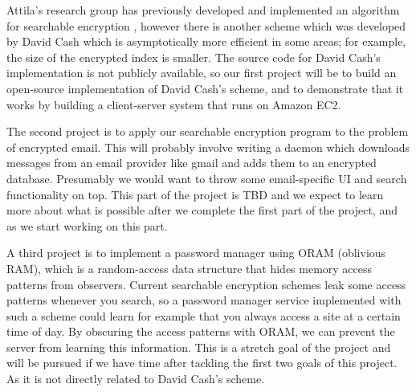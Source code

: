 

Attila's research group has previously developed and implemented an algorithm for searchable encryption \cite{yavuz15},
however there is another scheme which was developed by David Cash which is asymptotically more efficient \cite{cash14}
in some areas; for example, the size of the encrypted index is smaller.
The source code for David Cash's implementation is not publicly available, so
our first project will be to build an open-source implementation of David Cash's scheme,
and to demonstrate that it works by building a client-server system that runs on Amazon EC2.





The second project is to apply our searchable encryption program to the problem of encrypted email.
This will probably involve writing a daemon which downloads messages from an email provider like gmail
and adds them to an encrypted database.
Presumably we would want to throw some email-specific UI and search functionality on top.
This part of the project is TBD and we expect to learn more about what is possible after we complete the first part of the project, and as we start working on this part.




A third project is to implement a password manager using ORAM (oblivious RAM),
which is a random-access data structure that hides memory access patterns from observers.
Current searchable encryption schemes leak some access patterns whenever you search,
so a password manager service implemented with such a scheme could learn for example that you always access a site at a certain time of day.
By obscuring the access patterns with ORAM, we can prevent the server from learning this information. This is a stretch goal
of the project and will be pursued if we have time after tackling the first two goals of this project. As it is not directly
related to David Cash's scheme.


